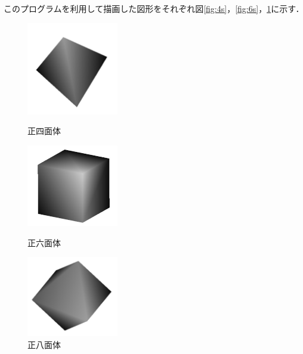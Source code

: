 \documentclass[]{jsarticle}
\begin{document}
このプログラムを利用して描画した図形をそれぞれ図\ref{fig:4s}，\ref{fig:6s}，\ref{fig:8s}に示す．

\begin{figure}[htbp]
\begin{center}
\begin{minipage}[b]{0.45\textwidth}
  \begin{center}
    \includegraphics[width=4cm,keepaspectratio]{4s.jpg}
    \caption{正四面体}
    \label{fig:4s}
  \end{center}
\end{minipage}
\begin{minipage}[b]{0.45\textwidth}
  \begin{center}
    \includegraphics[width=4cm,keepaspectratio]{6s.jpg}
    \caption{正六面体}
    \label{fig:6s}
  \end{center}
\end{minipage}
\begin{minipage}[b]{0.45\textwidth}
  \begin{center}
    \includegraphics[width=4cm,keepaspectratio]{8s.jpg}
    \caption{正八面体}
    \label{fig:8s}
  \end{center}
\end{minipage}
\end{center}
\end{figure}
\end{document}
